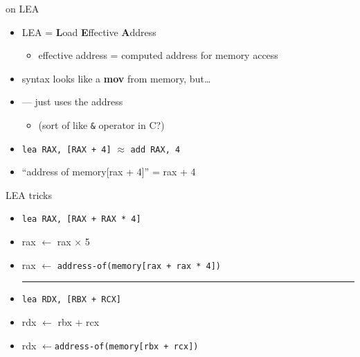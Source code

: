 \begin{frame}[fragile,label=LEA]{on LEA}
    \begin{itemize}
        \item LEA = \textbf{L}oad \textbf{E}ffective \textbf{A}ddress
        \begin{itemize}
            \item effective address = computed address for memory access
        \end{itemize}
    \item syntax looks like a \textbf{mov} from memory, but\ldots
    \item {} --- just uses the address
        \begin{itemize}
            \item (sort of like {\tt \&} operator in C?)
        \end{itemize}
    \item {}\lstinline|lea RAX, [RAX + 4]| $\approx$ \lstinline|add RAX, 4|
    \item<2-> ``address of memory[rax + 4]'' = rax + 4
    \end{itemize}
\end{frame}

\begin{frame}[fragile,label=LEATricks]{LEA tricks}
    \begin{itemize}
    \item {}\lstinline|lea RAX, [RAX + RAX * 4]|
    \item rax $\leftarrow$ rax $\times$ 5
    \item rax $\leftarrow$ {\tt address-of(memory[rax + rax * 4])}
    \vspace{.5cm}
            \hrule
    \vspace{.5cm}
    \item {}\lstinline|lea RDX, [RBX + RCX]|
    \item rdx $\leftarrow$ rbx $+$ rcx
    \item rdx $\leftarrow${\tt address-of(memory[rbx + rcx])}
    \end{itemize}
\end{frame}
